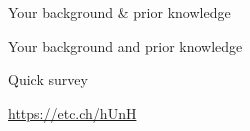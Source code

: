 \begin{frame}{Your background \& prior knowledge}
    \begin{center}
        \LARGE{Your background and prior knowledge}
    \end{center}
\end{frame}

\begin{frame}{Quick survey}
    \begin{center}
        \LARGE{\url{https://etc.ch/hUnH}}
        \vspace{1em}
        \begin{center}
        \end{center}
    \end{center}
\end{frame}
